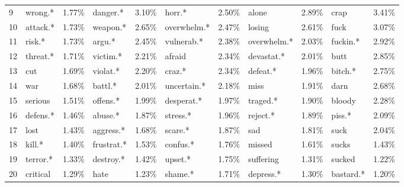 \begin{table}[h]
\begin{adjustbox}{width=\linewidth, center}
\begin{tabular}{lllllllllll}
	9                    &          wrong.* &     1.77\% &          danger.* &           3.10\% &       horr.* &     2.50\% &         alone &     2.89\% &             crap &            3.41\% \\
	10                   &         attack.* &     1.73\% &          weapon.* &           2.65\% &  overwhelm.* &     2.47\% &        losing &     2.61\% &             fuck &            3.07\% \\
	11                   &           risk.* &     1.73\% &            argu.* &           2.45\% &   vulnerab.* &     2.38\% &   overwhelm.* &     2.03\% &         fuckin.* &            2.92\% \\
	12                   &         threat.* &     1.71\% &          victim.* &           2.21\% &       afraid &     2.34\% &    devastat.* &     2.01\% &             butt &            2.85\% \\
	13                   &              cut &     1.69\% &          violat.* &           2.20\% &       craz.* &     2.34\% &      defeat.* &     1.96\% &          bitch.* &            2.75\% \\
	14                   &              war &     1.68\% &           battl.* &           2.01\% &  uncertain.* &     2.18\% &          miss &     1.91\% &             darn &            2.68\% \\
	15                   &          serious &     1.51\% &          offens.* &           1.99\% &   desperat.* &     1.97\% &      traged.* &     1.90\% &           bloody &            2.28\% \\
	16                   &         defens.* &     1.46\% &           abuse.* &           1.87\% &     stress.* &     1.96\% &      reject.* &     1.89\% &           piss.* &            2.09\% \\
	17                   &             lost &     1.43\% &         aggress.* &           1.68\% &      scare.* &     1.87\% &           sad &     1.81\% &             suck &            2.04\% \\
	18                   &           kill.* &     1.40\% &        frustrat.* &           1.53\% &     confus.* &     1.76\% &        missed &     1.61\% &            sucks &            1.43\% \\
	19                   &         terror.* &     1.33\% &         destroy.* &           1.42\% &      upset.* &     1.75\% &     suffering &     1.31\% &           sucked &            1.22\% \\
	20                   &         critical &     1.29\% &              hate &           1.23\% &      shame.* &     1.71\% &     depress.* &     1.30\% &        bastard.* &            1.20\% \\

\end{tabular}
\end{adjustbox}
\end{table}
